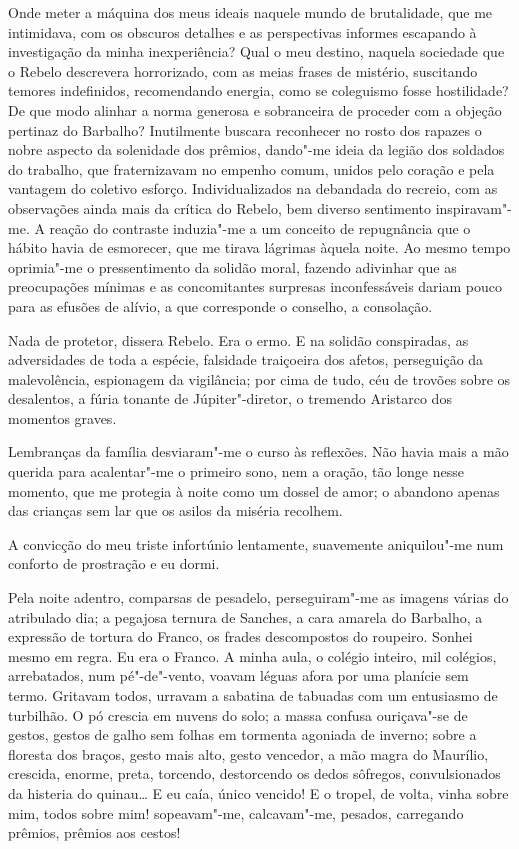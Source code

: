Onde meter a máquina dos meus ideais naquele mundo de brutalidade, que me intimidava, 
com os obscuros detalhes e as perspectivas informes escapando à investigação da minha
inexperiência? Qual o meu destino, naquela sociedade que o Rebelo
descrevera horrorizado, com as meias frases de mistério, suscitando
temores indefinidos, recomendando energia, como se coleguismo fosse
hostilidade? De que modo alinhar a norma generosa e sobranceira de
proceder com a objeção pertinaz do Barbalho? Inutilmente buscara
reconhecer no rosto dos rapazes o nobre aspecto da solenidade dos
prêmios, dando"-me ideia da legião dos soldados do trabalho, que
fraternizavam no empenho comum, unidos pelo coração e pela vantagem do
coletivo esforço. Individualizados na debandada do recreio, com as
observações ainda mais da crítica do Rebelo, bem diverso sentimento
inspiravam"-me. A reação do contraste induzia"-me a um conceito de
repugnância que o hábito havia de esmorecer, que me tirava lágrimas
àquela noite. Ao mesmo tempo oprimia"-me o pressentimento da solidão
moral, fazendo adivinhar que as preocupações mínimas e as concomitantes
surpresas inconfessáveis dariam pouco para as efusões de alívio, a que
corresponde o conselho, a consolação. 

Nada de protetor, dissera Rebelo.
Era o ermo. E na solidão conspiradas, as adversidades de toda a
espécie, falsidade traiçoeira dos afetos, perseguição da malevolência,
espionagem da vigilância; por cima de tudo, céu de trovões sobre os
desalentos, a fúria tonante de Júpiter"-diretor, o tremendo Aristarco
dos momentos graves. 

Lembranças da família desviaram"-me o curso às
reflexões. Não havia mais a mão querida para acalentar"-me o primeiro
sono, nem a oração, tão longe nesse momento, que me protegia à noite
como um dossel de amor; o abandono apenas das crianças sem lar que os
asilos da miséria recolhem. 

A convicção do meu triste infortúnio lentamente, suavemente 
aniquilou"-me num conforto de prostração e eu dormi. 

Pela noite adentro, comparsas de pesadelo, perseguiram"-me as
imagens várias do atribulado dia; a pegajosa ternura de Sanches, a cara
amarela do Barbalho, a expressão de tortura do Franco, os frades
descompostos do roupeiro. Sonhei mesmo em regra. Eu era o Franco. A
minha aula, o colégio inteiro, mil colégios, arrebatados, num
pé"-de"-vento, voavam léguas afora por uma planície sem termo.
Gritavam todos, urravam a sabatina de tabuadas com um entusiasmo de
turbilhão. O pó crescia em nuvens do solo; a massa confusa
ouriçava"-se de gestos, gestos de galho sem folhas em tormenta
agoniada de inverno; sobre a floresta dos braços, gesto mais alto,
gesto vencedor, a mão magra do Maurílio, crescida, enorme, preta,
torcendo, destorcendo os dedos sôfregos, convulsionados da histeria do
quinau\ldots{} E eu caía, único vencido! E o tropel, de volta, vinha sobre
mim, todos sobre mim! sopeavam"-me, calcavam"-me, pesados, carregando
prêmios, prêmios aos cestos! 

